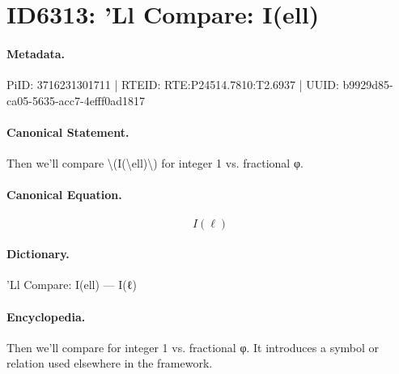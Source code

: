 \section*{ID6313: ’Ll Compare: I(ell)}
\paragraph{Metadata.}
PiID: 3716231301711 | RTEID: RTE:P24514.7810:T2.6937 | UUID: b9929d85-ca05-5635-acc7-4efff0ad1817

\paragraph{Canonical Statement.}
Then we’ll compare \textbackslash{}(I(\textbackslash{}ell)\textbackslash{}) for integer 1 vs. fractional φ.

\paragraph{Canonical Equation.}
\[
I(\ell)
\]

\paragraph{Dictionary.}
’Ll Compare: I(ell) — I(ℓ)

\paragraph{Encyclopedia.}
Then we’ll compare for integer 1 vs. fractional φ. It introduces a symbol or relation used elsewhere in the framework.
